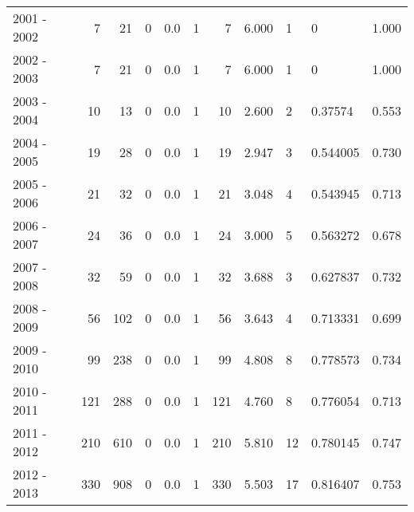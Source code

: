 \begin{tabular}{lrrrrrrrllr}
2001 - 2002 &        7 &       21 &                 0 &               0.0 &                       1 &                          7 &       6.000 &             1 &          0 &             1.000 \\
2002 - 2003 &        7 &       21 &                 0 &               0.0 &                       1 &                          7 &       6.000 &             1 &          0 &             1.000 \\
2003 - 2004 &       10 &       13 &                 0 &               0.0 &                       1 &                         10 &       2.600 &             2 &    0.37574 &             0.553 \\
2004 - 2005 &       19 &       28 &                 0 &               0.0 &                       1 &                         19 &       2.947 &             3 &   0.544005 &             0.730 \\
2005 - 2006 &       21 &       32 &                 0 &               0.0 &                       1 &                         21 &       3.048 &             4 &   0.543945 &             0.713 \\
2006 - 2007 &       24 &       36 &                 0 &               0.0 &                       1 &                         24 &       3.000 &             5 &   0.563272 &             0.678 \\
2007 - 2008 &       32 &       59 &                 0 &               0.0 &                       1 &                         32 &       3.688 &             3 &   0.627837 &             0.732 \\
2008 - 2009 &       56 &      102 &                 0 &               0.0 &                       1 &                         56 &       3.643 &             4 &   0.713331 &             0.699 \\
2009 - 2010 &       99 &      238 &                 0 &               0.0 &                       1 &                         99 &       4.808 &             8 &   0.778573 &             0.734 \\
2010 - 2011 &      121 &      288 &                 0 &               0.0 &                       1 &                        121 &       4.760 &             8 &   0.776054 &             0.713 \\
2011 - 2012 &      210 &      610 &                 0 &               0.0 &                       1 &                        210 &       5.810 &            12 &   0.780145 &             0.747 \\
2012 - 2013 &      330 &      908 &                 0 &               0.0 &                       1 &                        330 &       5.503 &            17 &   0.816407 &             0.753 \\

\end{tabular}
